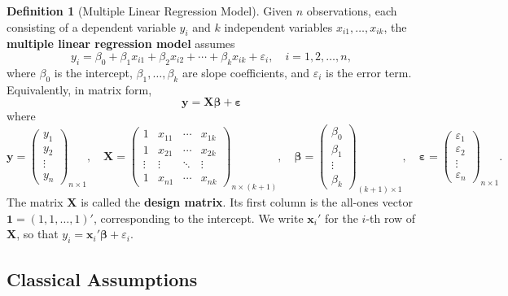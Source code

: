 \documentclass[14pt]{extarticle}
\theoremstyle{plain}
\theoremstyle{definition}
\newtheorem{definition}[theorem]{Definition}
\theoremstyle{remark}
\newcommand{\bX}{\mathbf{X}}
\newcommand{\by}{\mathbf{y}}
\newcommand{\bx}{\mathbf{x}}
\def\bb{\boldsymbol{\beta}}
\newcommand{\be}{\boldsymbol{\varepsilon}}
\newcommand{\bone}{\mathbf{1}}
\begin{document}
\begin{definition}[Multiple Linear Regression Model]\label{def:model}
Given $n$ observations, each consisting of a dependent variable $y_i$ and $k$ independent variables $x_{i1}, \ldots, x_{ik}$, the \textbf{multiple linear regression model} assumes
\begin{equation}
y_i = \beta_0 + \beta_1 x_{i1} + \beta_2 x_{i2} + \cdots + \beta_k x_{ik} + \varepsilon_i, \quad i = 1, 2, \ldots, n,
\end{equation}
where $\beta_0$ is the intercept, $\beta_1, \ldots, \beta_k$ are slope coefficients, and $\varepsilon_i$ is the error term. Equivalently, in matrix form,
\begin{equation}\label{eq:model-matrix}
\boxed{\by = \bX\bb + \be}
\end{equation}
where
\[
\by = \begin{pmatrix} y_1 \\ y_2 \\ \vdots \\ y_n \end{pmatrix}_{n \times 1}, \quad
\bX = \begin{pmatrix} 1 & x_{11} & \cdots & x_{1k} \\ 1 & x_{21} & \cdots & x_{2k} \\ \vdots & \vdots & \ddots & \vdots \\ 1 & x_{n1} & \cdots & x_{nk} \end{pmatrix}_{n \times (k+1)}, \quad
\bb = \begin{pmatrix} \beta_0 \\ \beta_1 \\ \vdots \\ \beta_k \end{pmatrix}_{(k+1) \times 1}, \quad
\be = \begin{pmatrix} \varepsilon_1 \\ \varepsilon_2 \\ \vdots \\ \varepsilon_n \end{pmatrix}_{n \times 1}.
\]
The matrix $\bX$ is called the \textbf{design matrix}. Its first column is the all-ones vector $\bone = (1, 1, \ldots, 1)'$, corresponding to the intercept. We write $\bx_i'$ for the $i$-th row of $\bX$, so that $y_i = \bx_i'\bb + \varepsilon_i$.
\end{definition}

\subsection{Classical Assumptions}
\end{document}
